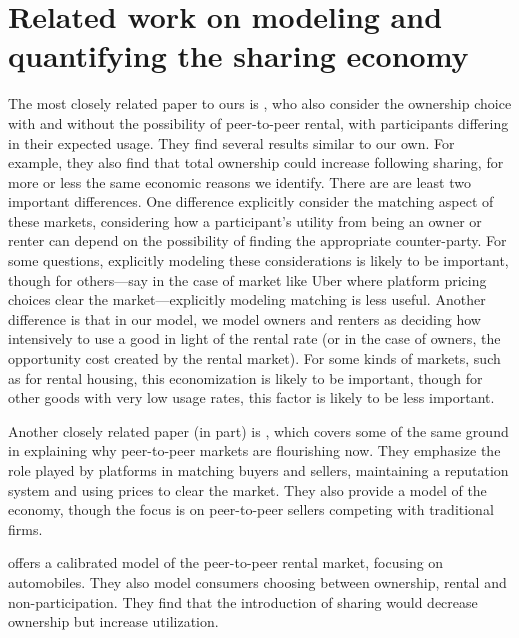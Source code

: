\documentclass[11pt]{article}
\begin{document}
\section{Related work on modeling and quantifying the sharing economy}

The most closely related paper to ours is \cite{benjaafar2015peer}, who also consider the ownership choice with and without the possibility of peer-to-peer rental, with participants differing in their expected usage. 
They find several results similar to our own.
For example, they also find that total ownership could increase following sharing, for more or less the same economic reasons we identify.
There are are least two important differences.
One difference \cite{benjaafar2015peer} explicitly consider the matching aspect of these markets, considering how a participant's utility from being an owner or renter can depend on the possibility of finding the appropriate counter-party.
For some questions, explicitly modeling these considerations is likely to be important, though for others---say in the case of market like Uber where platform pricing choices clear the market---explicitly modeling matching is less useful. 
Another difference is that in our model, we model owners and renters as deciding how intensively to use a good in light of the rental rate (or in the case of owners, the opportunity cost created by the rental market).
For some kinds of markets, such as for rental housing, this economization is likely to be important, though for other goods with very low usage rates, this factor is likely to be less important. 

Another closely related paper (in part) is \cite{einav2015peer}, which covers some of the same ground in explaining why peer-to-peer markets are flourishing now.
They emphasize the role played by platforms in matching buyers and sellers, maintaining a reputation system and using prices to clear the market.
They also provide a model of the economy, though the focus is on peer-to-peer sellers competing with traditional firms. 

\cite{frailberger2015} offers a calibrated model of the peer-to-peer rental market, focusing on automobiles.
They also model consumers choosing between ownership, rental and non-participation.
They find that the introduction of sharing would decrease ownership but increase utilization. 
\end{document}

